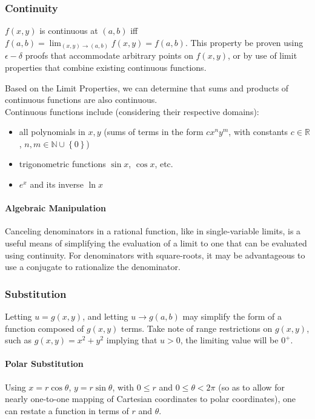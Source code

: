 \documentclass{article}
\begin{document}
\subsubsection{Continuity}
$f(x,y)$ is continuous at $(a,b)$ iff $f(a,b)=\lim_{(x,y)\to(a,b)}f(x,y) = f(a,b)$. This property be proven using $\epsilon-\delta$ proofs that accommodate arbitrary points on $f(x,y)$, or by use of limit properties that combine existing continuous functions.

Based on the Limit Properties, we can determine that sums and products of continuous functions are also continuous.\\
Continuous functions include (considering their respective domains):
\begin{itemize}
    \item all polynomials in $x,y$ (sums of terms in the form $cx^ny^m$, with constants $c\in\mathbb{R}$, $n,m\in\mathbb{N}\cup\left\{0\right\}$)
    \item trigonometric functions $\sin{x}$, $\cos{x}$, etc.
    \item $e^x$ and its inverse $\ln{x}$
\end{itemize}

\paragraph{Algebraic Manipulation}
Canceling denominators in a rational function, like in single-variable limits, is a useful means of simplifying the evaluation of a limit to one that can be evaluated using continuity. For denominators with square-roots, it may be advantageous to use a conjugate to rationalize the denominator.

\subsubsection{Substitution}
Letting $u=g(x,y)$, and letting $u\to g(a,b)$ may simplify the form of a function composed of $g(x,y)$ terms. Take note of range restrictions on $g(x,y)$, such as $g(x,y)=x^2+y^2$ implying that $u > 0$, the limiting value will be $0^+$.

\paragraph{Polar Substitution}
Using $x = r\cos{\theta}$, $y=r\sin{\theta}$, with $0 \le r$ and $0\le\theta<2\pi$ (so as to allow for nearly one-to-one mapping of Cartesian coordinates to polar coordinates), one can restate a function in terms of $r$ and $\theta$.
\end{document}

